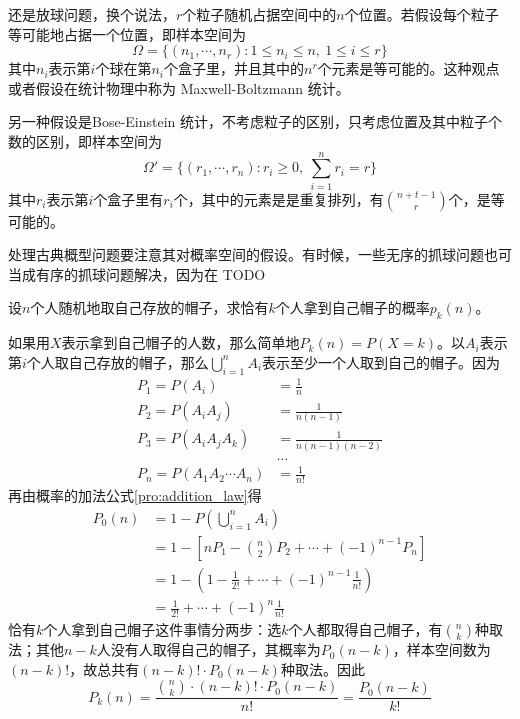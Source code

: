 \begin{example}
    还是放球问题，换个说法，$r$个粒子随机占据空间中的$n$个位置。若假设每个粒子等可能地占据一个位置，即样本空间为
    \[ \Omega= \{(n_1, \cdots ,n_r):1 \le n_i \le n ,\ 1 \le i \le r\} \]
    其中$n_i$表示第$i$个球在第$n_i$个盒子里，并且其中的$n^r$个元素是等可能的。这种观点或者假设在统计物理中称为 Maxwell-Boltzmann 统计。

    另一种假设是Bose-Einstein 统计，不考虑粒子的区别，只考虑位置及其中粒子个数的区别，即样本空间为
    \[ \Omega'= \{(r_1, \cdots ,r_n): r_i\ge 0 ,\ \sum_{i=1}^n r_i = r\} \]
    其中$r_i$表示第$i$个盒子里有$r_i$个，其中的元素是是重复排列，有$\binom{n+t-1}{r}$个，是等可能的。
\end{example}

处理古典概型问题要注意其对概率空间的假设。有时候，一些无序的抓球问题也可当成有序的抓球问题解决，因为在
TODO

\begin{example}[配对问题]\label{exam:pairing}
    设$n$个人随机地取自己存放的帽子，求恰有$k$个人拿到自己帽子的概率$p_k(n)$。
\end{example}
\begin{solution}
    如果用$X$表示拿到自己帽子的人数，那么简单地$P_k(n) = P(X = k)$。以$A_i$表示第$i$个人取自己存放的帽子，那么$\bigcup_{i=1}^n A_i$表示至少一个人取到自己的帽子。因为
    \begin{align*}
        P_1 = P(A_i)                & = \frac1{n}             \\
        P_2 = P(A_i A_j)            & = \frac1{n (n-1)}       \\
        P_3 = P(A_i A_j A_k)        & = \frac1{n (n-1) (n-2)} \\
                                    & \ldots                  \\
        P_n = P(A_1 A_2 \dotsb A_n) & = \frac1{n!}
    \end{align*}
    再由概率的加法公式\ref{pro:addition_law}得
    \begin{align*}
        P_0(n) & = 1 - P(\bigcup_{i=1}^n A_i)                             \\
               & = 1 - [n P_1 - \binom{n}{2} P_2 + \cdots+(-1)^{n-1} P_n] \\
               & = 1-(1 - \frac1{2!} + \dotsb + (-1)^{n-1} \frac1{n!})    \\
               & = \frac1{2!} + \dotsb + (-1)^n \frac1{n!}
    \end{align*}
    恰有$k$个人拿到自己帽子这件事情分两步：选$k$个人都取得自己帽子，有$\binom{n}{k}$种取法；其他$n-k$人没有人取得自己的帽子，其概率为$P_0(n-k)$，样本空间数为$(n-k)!$，故总共有$(n-k)!\cdot P_0(n-k)$种取法。因此
    \[ P_k(n)=\frac{\binom{n}{k} \cdot (n-k)!\cdot P_0(n-k)}{n!}=\frac{P_0(n-k)}{k!} \]
\end{solution}

